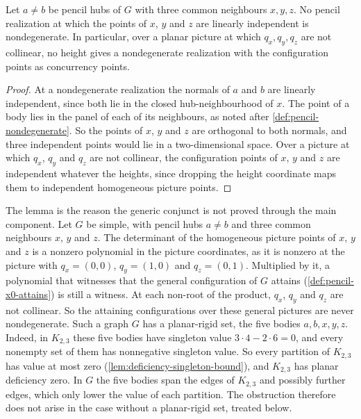 \begin{lemma}
  \label{lem:pencil-x0-two-hubs-obstruction}
  \leanok
  Let $a \ne b$ be pencil hubs of $G$ with three common neighbours $x, y,
  z$. No pencil realization at which the points of $x$, $y$ and $z$ are
  linearly independent is nondegenerate. In particular, over a planar
  picture at which $q_x, q_y, q_z$ are not collinear, no height gives a
  nondegenerate realization with the configuration points as concurrency
  points.
\end{lemma}
\begin{proof}
  \leanok
  At a nondegenerate realization the normals of $a$ and $b$ are linearly
  independent, since both lie in the closed hub-neighbourhood of $x$. The
  point of a body lies in the panel of each of its neighbours, as noted
  after \cref{def:pencil-nondegenerate}. So the points of $x$, $y$ and $z$
  are orthogonal to both normals, and three independent points would lie
  in a two-dimensional space. Over a picture at which $q_x$, $q_y$ and
  $q_z$ are not collinear, the configuration points of $x$, $y$ and $z$
  are independent whatever the heights, since dropping the height
  coordinate maps them to independent homogeneous picture points.
\end{proof}

The lemma is the reason the generic conjunct is not proved through the
main component. Let $G$ be simple, with pencil hubs $a \neq b$ and three
common neighbours $x$, $y$ and $z$. The determinant of the homogeneous
picture points of $x$, $y$ and $z$ is a nonzero polynomial in the picture
coordinates, as it is nonzero at the picture with $q_x = (0, 0)$,
$q_y = (1, 0)$ and $q_z = (0, 1)$. Multiplied by it, a polynomial that
witnesses that the general configuration of $G$ attains
(\cref{def:pencil-x0-attains}) is still a witness. At each non-root of
the product, $q_x$, $q_y$ and $q_z$ are not collinear. So the attaining
configurations over these general pictures are never nondegenerate. Such
a graph $G$ has a planar-rigid set, the five bodies $a, b, x, y, z$.
Indeed, in $K_{2,3}$ these five bodies have singleton value
$3 \cdot 4 - 2 \cdot 6 = 0$, and every nonempty set of them has
nonnegative singleton value. So every partition of $K_{2,3}$ has value at
most zero (\cref{lem:deficiency-singleton-bound}), and $K_{2,3}$ has
planar deficiency zero. In $G$ the five bodies span the edges of
$K_{2,3}$ and possibly further edges, which only lower the value of each
partition. The obstruction therefore does not arise in the case without a
planar-rigid set, treated below.

